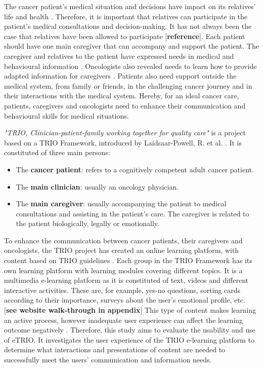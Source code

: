 \documentclass{sigchi}
\begin{document}
The cancer patient’s medical situation and decisions have impact on its relatives’ life and health \cite{Bevans2012}. Therefore, it is important that relatives can participate in the patient’s medical consultations and decision-making. It has not always been the case that relatives have been allowed to participate [\textbf{reference}]. Each patient should have one main caregiver that can accompany and support the patient. The caregiver and relatives to the patient have expressed needs in medical and behavioural information \cite{Lamore2017}. Oncologists also revealed needs to learn how to provide adapted information for caregivers \cite{Stuij2018}. Patients also need support outside the medical system, from family or friends, in the challenging cancer journey and in their interactions with the medical system. Hereby, for an ideal cancer care, patients, caregivers and oncologists need to enhance their communication and behavioural skills for medical situations. 

\textit{"TRIO, Clinician-patient-family working together for quality care"} is a project based on a TRIO Framework, introduced by Laidsaar-Powell, R. et al. \cite{Laidsaar-Powell2017}. It is constituted of three main persons:

\begin{itemize}[noitemsep]
    \item The \textbf{cancer patient}: refers to a cognitively competent adult cancer patient.
    \item The \textbf{main clinician}: usually an oncology physician.
    \item The \textbf{main caregiver}: usually accompanying the patient to medical consultations and assisting in the patient’s care. The caregiver is related to the patient biologically, legally or emotionally.
\end{itemize}

To enhance the communication between cancer patients, their caregivers and oncologists, the TRIO project has created an online learning platform, with content based on TRIO guidelines \cite{Laidsaar-Powell2018a, Laidsaar-Powell2018}. Each group in the TRIO Framework has its own learning platform with learning modules covering different topics. It is a multimedia e-learning platform as it is constituted of text, videos and different interactive activities. These are, for example, yes-no questions, sorting cards according to their importance, surveys about the user’s emotional profile, etc. [\textbf{see website walk-through in appendix}] This type of content makes learning an active process, however inadequate user experience can affect the learning outcome negatively \cite{Huang2005}. Therefore, this study aims to evaluate the usability and use of eTRIO. It investigates the user experience of the TRIO e-learning platform to determine what interactions and presentations of content are needed to successfully meet the users' communication and information needs.
\end{document}

